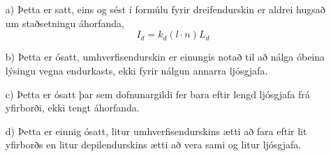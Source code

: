 \documentclass{article}
\begin{document}
	\section{}
	\begin{itemize}
		\item[a)] Þetta er satt, eins og sést í formúlu fyrir dreifendurskin 
			er aldrei hugsað um staðsetningu áhorfanda, 
			\begin{equation}
				I_d = k_d(l\cdot n)L_d
				\label{eq:diffuse}
			\end{equation}
		\item[b)] Þetta er ósatt, umhverfisendurskin er einungis notað til 
			að nálga óbeina lýsingu vegna endurkasts, ekki fyrir nálgun 
			annarra ljósgjafa.
		\item[c)] Þetta er ósatt þar sem dofnunargildi fer bara eftir lengd 
			ljósgjafa frá yfirborði, ekki tengt áhorfanda.
		\item[d)] Þetta er einnig ósatt, litur umhverfisendurskins ætti að 
			fara eftir lit yfirborðs en litur depilendurskins ætti að vera 
			sami og litur ljósgjafa.
	\end{itemize}
\end{document}
